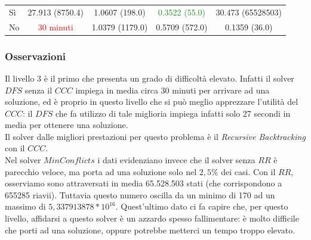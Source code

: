 \begin{table} 
	\begin{tabular}{|l||*{4}{c|}}\hline 
		\backslashbox{Miglioria}{Solver} 
		&\makebox{DFS}&\makebox{Backtracking}&\makebox{Recursive Backtracking}	&\makebox{MinConflicts}\\ \hline 
		Sì&27.913 (8750.4)&1.0607 (198.0)&\textcolor{ForestGreen}{0.3522 (55.0)}&30.473 (65528503) \\ \hline 
		No& \textcolor{red}{30 minuti}&1.0379 (1179.0)&0.5709 (572.0)&0.1359 (36.0)  \\ \hline 
	\end{tabular} 
\end{table}

\subsubsection{Osservazioni}
Il livello 3 è il primo che presenta un grado di difficoltà elevato. Infatti il solver $DFS$ senza il $CCC$ impiega in media circa 30 minuti per arrivare ad una soluzione, ed è proprio in questo livello che si può meglio apprezzare l'utilità del $CCC$: il $DFS$ che fa utilizzo di tale miglioria impiega infatti solo 27 secondi in media per ottenere una soluzione.\\
Il solver dalle migliori prestazioni per questo problema è il \textit{Recursive Backtracking} con il $CCC$.\\

Nel solver $MinConflicts$ i dati evidenziano invece che il solver senza $RR$ è parecchio veloce, ma porta ad una soluzione solo nel $2,5\%$ dei casi.
Con il $RR$, osserviamo sono attraversati in media 65.528.503 stati (che corrispondono a 655285 riavii). Tuttavia questo numero oscilla da un minimo di 170 ad un massimo di $5,337913878*10^{16}$.
Quest'ultimo dato ci fa capire che, per questo livello, affidarsi a questo solver è un azzardo spesso fallimentare: è molto difficile che porti ad una soluzione, oppure potrebbe metterci un tempo troppo elevato. 
